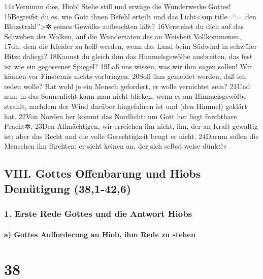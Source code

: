 14»Vernimm dies, Hiob! Stehe still und erwäge die Wunderwerke Gottes!
15Begreifst du es, wie Gott ihnen Befehl erteilt und das
Licht\textless sup title=``=~den Blitzstrahl''\textgreater✲ seines
Gewölks aufleuchten läßt? 16Verstehst du dich auf das Schweben der
Wolken, auf die Wundertaten des an Weisheit Vollkommenen, 17du, dem die
Kleider zu heiß werden, wenn das Land beim Südwind in schwüler Hitze
daliegt? 18Kannst du gleich ihm das Himmelsgewölbe ausbreiten, das fest
ist wie ein gegossener Spiegel? 19Laß uns wissen, was wir ihm sagen
sollen! Wir können vor Finsternis nichts vorbringen. 20Soll ihm gemeldet
werden, daß ich reden wolle? Hat wohl je ein Mensch gefordert, er wolle
vernichtet sein? 21Und nun: in das Sonnenlicht kann man nicht blicken,
wenn es am Himmelsgewölbe strahlt, nachdem der Wind darüber hingefahren
ist und (den Himmel) geklärt hat. 22Von Norden her kommt das Nordlicht:
um Gott her liegt furchtbare Pracht✲. 23Den Allmächtigen, wir erreichen
ihn nicht, ihn, der an Kraft gewaltig ist; aber das Recht und die volle
Gerechtigkeit beugt er nicht. 24Darum sollen die Menschen ihn fürchten:
er sieht keinen an, der sich selbst weise dünkt!«

\hypertarget{viii.-gottes-offenbarung-und-hiobs-demuxfctigung-381-426}{%
\subsection{VIII. Gottes Offenbarung und Hiobs Demütigung
(38,1-42,6)}\label{viii.-gottes-offenbarung-und-hiobs-demuxfctigung-381-426}}

\hypertarget{erste-rede-gottes-und-die-antwort-hiobs}{%
\subsubsection{1. Erste Rede Gottes und die Antwort
Hiobs}\label{erste-rede-gottes-und-die-antwort-hiobs}}

\hypertarget{a-gottes-aufforderung-an-hiob-ihm-rede-zu-stehen}{%
\paragraph{a) Gottes Aufforderung an Hiob, ihm Rede zu
stehen}\label{a-gottes-aufforderung-an-hiob-ihm-rede-zu-stehen}}

\hypertarget{section-37}{%
\section{38}\label{section-37}}

